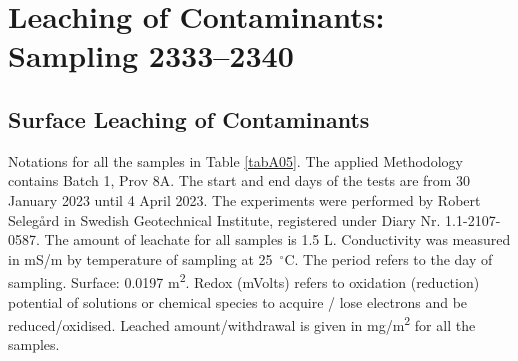 \documentclass[algorithms,article,accept,pdftex,moreauthors]{Definitions/mdpi}
\begin{document}
\section[\appendixname~\thesection]{Leaching of Contaminants: Sampling 2333--2340}\label{AppC1}
\subsection[\appendixname~\thesubsection]{Surface Leaching of Contaminants}

Notations for all the samples in Table \ref{tabA05}. The applied Methodology contains Batch 1, Prov 8A. The start and end days of the tests are from 30 January 2023 until 4 April 2023. The experiments were performed by Robert Selegård in Swedish Geotechnical Institute, registered under Diary Nr. 1.1-2107-0587. The amount of leachate for all samples is 1.5 L. Conductivity was measured in mS/m by temperature of sampling at 25~$^\circ$C. The period refers to the day of sampling. Surface: 0.0197 m\textsuperscript{2}. Redox (mVolts) refers to oxidation (reduction) potential of solutions or chemical species to acquire / lose electrons and be reduced/oxidised. Leached amount/withdrawal is given in mg/m\textsuperscript{2} for all the samples.
\end{document}

